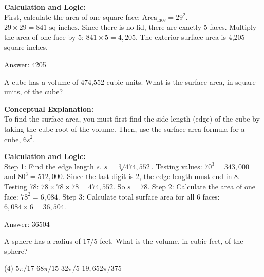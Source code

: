 \documentclass[11pt,paper=a4,answers]{exam}
\begin{document}
\begin{questions}
\begin{solution}
\textbf{Calculation and Logic:} \\
First, calculate the area of one square face: $\text{Area}_{\text{face}} = 29^2$. $29 \times 29 = 841 \text{ sq inches}$. Since there is no lid, there are exactly 5 faces. Multiply the area of one face by 5: $841 \times 5 = 4,205$. The exterior surface area is 4,205 square inches.

\vspace{30pt}

Answer: \colorbox{yellow!100}{4205}
\end{solution}

\vspace{60pt}

\question
A cube has a volume of 474,552 cubic units. What is the surface area, in square units, of the cube?

\begin{solution}
\textbf{Conceptual Explanation:} \\
To find the surface area, you must first find the side length (edge) of the cube by taking the cube root of the volume. Then, use the surface area formula for a cube, $6s^2$.

\vspace{30pt}

\textbf{Calculation and Logic:} \\
Step 1: Find the edge length $s$. $s = \sqrt[3]{474,552}$. Testing values: $70^3 = 343,000$ and $80^3 = 512,000$. Since the last digit is 2, the edge length must end in 8. Testing 78: $78 \times 78 \times 78 = 474,552$. So $s = 78$. Step 2: Calculate the area of one face: $78^2 = 6,084$. Step 3: Calculate total surface area for all 6 faces: $6,084 \times 6 = 36,504$.

\vspace{30pt}

Answer: \colorbox{yellow!100}{36504}
\end{solution}

\vspace{60pt}

\question
A sphere has a radius of 17/5 feet. What is the volume, in cubic feet, of the sphere?
\begin{tasks}(4)
    \task $5\pi/17$
    \task $68\pi/15$
    \task $32\pi/5$
    \task $19,652\pi/375$
\end{tasks}


\end{questions}
\end{document}
